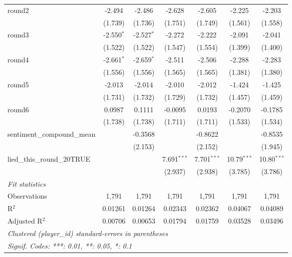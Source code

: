 \begin{tabular}{lcccccc}
   round2                       & -2.494        & -2.486        & -2.628        & -2.605        & -2.225        & -2.203\\   
                                & (1.739)       & (1.736)       & (1.751)       & (1.749)       & (1.561)       & (1.558)\\   
   round3                       & -2.550$^{*}$  & -2.527$^{*}$  & -2.272        & -2.222        & -2.091        & -2.041\\   
                                & (1.522)       & (1.522)       & (1.547)       & (1.554)       & (1.399)       & (1.400)\\   
   round4                       & -2.661$^{*}$  & -2.659$^{*}$  & -2.511        & -2.506        & -2.288        & -2.283\\   
                                & (1.556)       & (1.556)       & (1.565)       & (1.565)       & (1.381)       & (1.380)\\   
   round5                       & -2.013        & -2.014        & -2.010        & -2.012        & -1.424        & -1.425\\   
                                & (1.731)       & (1.732)       & (1.729)       & (1.732)       & (1.457)       & (1.459)\\   
   round6                       & 0.0987        & 0.1111        & -0.0095       & 0.0193        & -0.2070       & -0.1785\\   
                                & (1.738)       & (1.738)       & (1.711)       & (1.711)       & (1.533)       & (1.534)\\   
   sentiment\_compound\_mean    &               & -0.3568       &               & -0.8622       &               & -0.8535\\   
                                &               & (2.153)       &               & (2.152)       &               & (1.945)\\   
   lied\_this\_round\_20TRUE    &               &               & 7.691$^{***}$ & 7.701$^{***}$ & 10.79$^{***}$ & 10.80$^{***}$\\   
                                &               &               & (2.937)       & (2.938)       & (3.785)       & (3.786)\\   
   \midrule
   \emph{Fit statistics}\\
   Observations                 & 1,791         & 1,791         & 1,791         & 1,791         & 1,791         & 1,791\\  
   R$^2$                        & 0.01261       & 0.01264       & 0.02343       & 0.02362       & 0.04067       & 0.04089\\  
   Adjusted R$^2$               & 0.00706       & 0.00653       & 0.01794       & 0.01759       & 0.03528       & 0.03496\\  
   \midrule \midrule
   \multicolumn{7}{l}{\emph{Clustered (player\_id) standard-errors in parentheses}}\\
   \multicolumn{7}{l}{\emph{Signif. Codes: ***: 0.01, **: 0.05, *: 0.1}}\\
\end{tabular}
\par\endgroup


